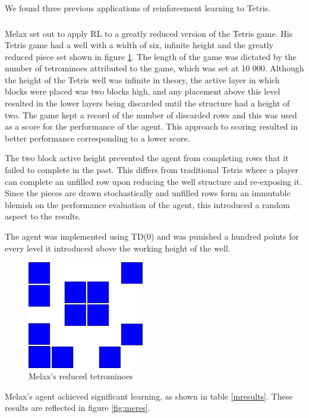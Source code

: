 \documentclass{rucsthesis}
\begin{document}
We found three previous applications of reinforcement learning to Tetris.

\subsubsection{\cite{melaxtetris}}

Melax set out to apply RL to a greatly reduced version of the Tetris game. His Tetris game had a well with a width of six, infinite height and the greatly reduced piece set shown in figure \ref{fig:melaxpieces}. The length of the game was dictated by the number of tetrominoes attributed to the game, which was set at 10 000. Although the height of the Tetris well was infinite in theory, the active layer in which blocks were placed was two blocks high, and any placement above this level resulted in the lower layers being discarded until the structure had a height of two. The game kept a record of the number of discarded rows and this was used as a score for the performance of the agent. This approach to scoring resulted in better performance corresponding to a lower score. 

The two block active height prevented the agent from completing rows that it failed to complete in the past. This differs from traditional Tetris where a player can complete an unfilled row upon reducing the well structure and re-exposing it. Since the pieces are drawn stochastically and unfilled rows form an immutable blemish on the performance evaluation of the agent, this introduced a random aspect to the results.

The agent was implemented using TD(0) and was punished a hundred points for every level it introduced above the working height of the well.

\begin{figure}[h]
\centering
\includegraphics[width=2in]{reducedblocks.png}
\caption{Melax's reduced tetrominoes}
\label{fig:melaxpieces}
\end{figure}

Melax's agent achieved significant learning, as shown in table \ref{mresults}. These results are reflected in figure \ref{fig:meres}.
\end{document}
